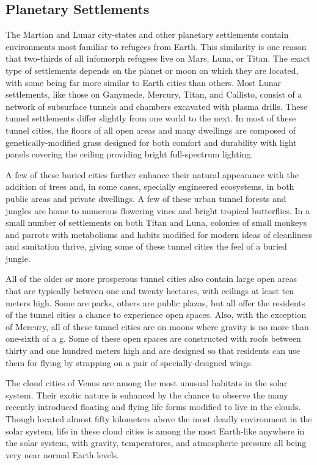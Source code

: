 \subsection{Planetary Settlements}

The Martian and Lunar city-states and other planetary
settlements contain environments most familiar
to refugees from Earth. This similarity is one reason 
that two-thirds of all infomorph refugees live on 
Mars, Luna, or Titan. The exact type of settlements 
depends on the planet or moon on which they are 
located, with some being far more similar to Earth 
cities than others. Most Lunar settlements, like those 
on Ganymede, Mercury, Titan, and Callisto, consist 
of a network of subsurface tunnels and chambers excavated
with plasma drills. These tunnel settlements
differ slightly from one world to the next. In most 
of these tunnel cities, the floors of all open areas 
and many dwellings are composed of genetically-modified
grass designed for both comfort and durability
with light panels covering the ceiling providing
bright full-spectrum lighting.

A few of these buried cities further enhance their 
natural appearance with the addition of trees and, in 
some cases, specially engineered ecosystems, in both 
public areas and private dwellings. A few of these 
urban tunnel forests and jungles are home to numerous
flowering vines and bright tropical butterflies.
In a small number of settlements on both Titan and 
Luna, colonies of small monkeys and parrots with 
metabolisms and habits modified for modern ideas 
of cleanliness and sanitation thrive, giving some of 
these tunnel cities the feel of a buried jungle.

All of the older or more prosperous tunnel cities 
also contain large open areas that are typically between
one and twenty hectares, with ceilings at least
ten meters high. Some are parks, others are public 
plazas, but all offer the residents of the tunnel cities 
a chance to experience open spaces. Also, with the 
exception of Mercury, all of these tunnel cities are on 
moons where gravity is no more than one-sixth of a g. 
Some of these open spaces are constructed with roofs 
between thirty and one hundred meters high and are 
designed so that residents can use them for flying by 
strapping on a pair of specially-designed wings.

The cloud cities of Venus are among the most unusual
habitats in the solar system. Their exotic nature
is enhanced by the chance to observe the many recently
introduced floating and flying life forms modified
to live in the clouds. Though located almost fifty
kilometers above the most deadly environment in the 
solar system, life in these cloud cities is among the 
most Earth-like anywhere in the solar system, with 
gravity, temperatures, and atmospheric pressure all 
being very near normal Earth levels.

